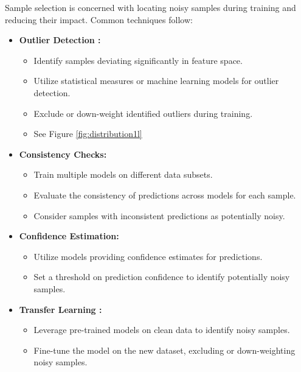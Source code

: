 \documentclass[11pt,twocolumn,letterpaper]{article}
\begin{document}
Sample selection is concerned with locating noisy samples during training and reducing their impact. Common techniques follow:

\begin{itemize}
    \item \textbf{Outlier Detection \cite{songRobustLearningSelfTransition2021} \cite{chenSamplePriorGuided2022}:}
    \begin{itemize}
        \item Identify samples deviating significantly in feature space.
        \item Utilize statistical measures or machine learning models for outlier detection.
        \item Exclude or down-weight identified outliers during training.
        \item See Figure \ref{fig:distribution1l}
    \end{itemize}
    
    \item \textbf{Consistency Checks:}
    \begin{itemize}
        \item Train multiple models on different data subsets.
        \item Evaluate the consistency of predictions across models for each sample.
        \item Consider samples with inconsistent predictions as potentially noisy.
    \end{itemize}
    
    \item \textbf{Confidence Estimation: \cite{xiaAdaptiveGeneralModel2022}}
    \begin{itemize}
        \item Utilize models providing confidence estimates for predictions.
        \item Set a threshold on prediction confidence to identify potentially noisy samples.
    \end{itemize}
    
    \item \textbf{Transfer Learning \cite{leeCleanNetTransferLearning2018}:}
    \begin{itemize}
        \item Leverage pre-trained models on clean data to identify noisy samples.
        \item Fine-tune the model on the new dataset, excluding or down-weighting noisy samples.
    \end{itemize}
\end{itemize}
\end{document}
